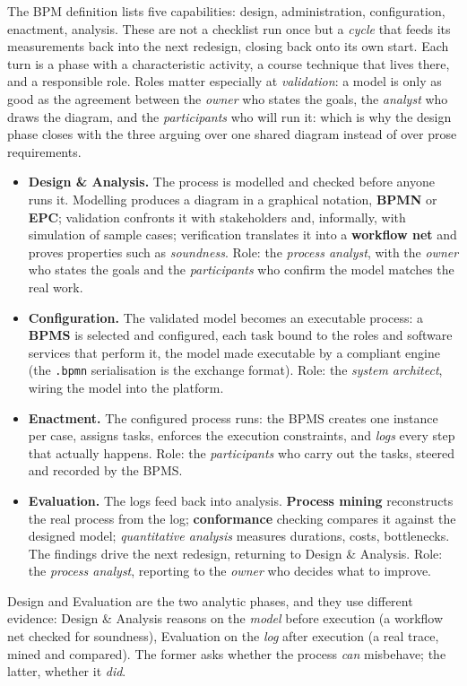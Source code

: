 The BPM definition lists five capabilities: design, administration, configuration, enactment, analysis. These are not a checklist run once but a \emph{cycle} that feeds its measurements back into the next redesign, closing back onto its own start. Each turn is a phase with a characteristic activity, a course technique that lives there, and a responsible role. Roles matter especially at \emph{validation}: a model is only as good as the agreement between the \emph{owner} who states the goals, the \emph{analyst} who draws the diagram, and the \emph{participants} who will run it: which is why the design phase closes with the three arguing over one shared diagram instead of over prose requirements.
\begin{itemize}
  \item \textbf{Design \& Analysis.} The process is modelled and checked before anyone runs it. Modelling produces a diagram in a graphical notation, \textbf{BPMN} or \textbf{EPC}; validation confronts it with stakeholders and, informally, with simulation of sample cases; verification translates it into a \textbf{workflow net} and proves properties such as \emph{soundness}. Role: the \emph{process analyst}, with the \emph{owner} who states the goals and the \emph{participants} who confirm the model matches the real work.
  \item \textbf{Configuration.} The validated model becomes an executable process: a \textbf{BPMS} is selected and configured, each task bound to the roles and software services that perform it, the model made executable by a compliant engine (the \texttt{.bpmn} serialisation is the exchange format). Role: the \emph{system architect}, wiring the model into the platform.
  \item \textbf{Enactment.} The configured process runs: the BPMS creates one instance per case, assigns tasks, enforces the execution constraints, and \emph{logs} every step that actually happens. Role: the \emph{participants} who carry out the tasks, steered and recorded by the BPMS.
  \item \textbf{Evaluation.} The logs feed back into analysis. \textbf{Process mining} reconstructs the real process from the log; \textbf{conformance} checking compares it against the designed model; \emph{quantitative analysis} measures durations, costs, bottlenecks. The findings drive the next redesign, returning to Design \& Analysis. Role: the \emph{process analyst}, reporting to the \emph{owner} who decides what to improve.
\end{itemize}
Design and Evaluation are the two analytic phases, and they use different evidence: Design \& Analysis reasons on the \emph{model} before execution (a workflow net checked for soundness), Evaluation on the \emph{log} after execution (a real trace, mined and compared). The former asks whether the process \emph{can} misbehave; the latter, whether it \emph{did}.

